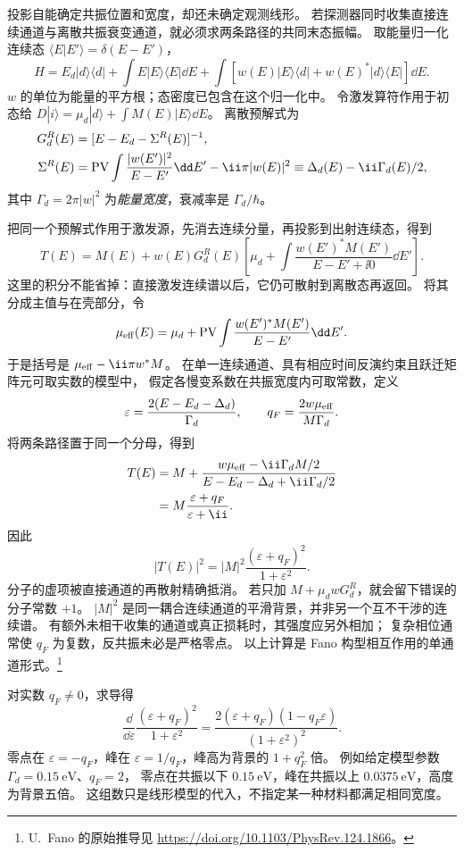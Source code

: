 \begin{exbox}
投影自能确定共振位置和宽度，却还未确定观测线形。
若探测器同时收集直接连续通道与离散共振衰变通道，就必须求两条路径的共同末态振幅。
取能量归一化连续态 $\langle E|E'\rangle=\delta(E-E')$，
\[
H=E_d|d\rangle\langle d|+\int E|E\rangle\langle E|\dd E
+\int[w(E)|E\rangle\langle d|+w(E)^*|d\rangle\langle E|]\dd E.
\]
$w$ 的单位为能量的平方根；态密度已包含在这个归一化中。
令激发算符作用于初态给
$D|i\rangle=\mu_d|d\rangle+\int M(E)|E\rangle\dd E$。
离散预解式为
\begin{align}
G_d^R(E)&=[E-E_d-\Sigma^R(E)]^{-1},
\label{eq:feqo-fano-selfenergy}\\
\Sigma^R(E)&=\mathop{\rm PV}\int\frac{|w(E')|^2}{E-E'}\dd E'
-\ii\pi|w(E)|^2\equiv\Delta_d(E)-\ii\Gamma_d(E)/2,
\label{eq:feqo-fano-width-shift}
\end{align}
其中 $\Gamma_d=2\pi|w|^2$ 为\emph{能量宽度}，衰减率是 $\Gamma_d/\hbar$。

把同一个预解式作用于激发源，先消去连续分量，再投影到出射连续态，得到
\[
T(E)=M(E)+w(E)G_d^R(E)
\left[\mu_d+\int\frac{w(E')^*M(E')}{E-E'+\ii0}\dd E'\right].
\]
这里的积分不能省掉：直接激发连续谱以后，它仍可散射到离散态再返回。
将其分成主值与在壳部分，令
\[
\mu_{\rm eff}(E)=\mu_d+\mathop{\rm PV}\int
\frac{w(E')^*M(E')}{E-E'}\dd E'.
\]
于是括号是 $\mu_{\rm eff}-\ii\pi w^*M$。
在单一连续通道、具有相应时间反演约束且跃迁矩阵元可取实数的模型中，
假定各慢变系数在共振宽度内可取常数，定义
\begin{equation}
\varepsilon=\frac{2(E-E_d-\Delta_d)}{\Gamma_d},
\qquad q_F=\frac{2w\mu_{\rm eff}}{M\Gamma_d}.
\label{eq:feqo-fano-q}
\end{equation}
将两条路径置于同一个分母，得到
\begin{align*}
T(E)&=M+\frac{w\mu_{\rm eff}-\ii\Gamma_dM/2}
{E-E_d-\Delta_d+\ii\Gamma_d/2}\\
&=M\frac{\varepsilon+q_F}{\varepsilon+\ii}.
\end{align*}
因此
\begin{equation}
|T(E)|^2=|M|^2\frac{(\varepsilon+q_F)^2}{1+\varepsilon^2}.
\label{eq:feqo-fano-lineshape}
\end{equation}
分子的虚项被直接通道的再散射精确抵消。
若只加 $M+\mu_dwG_d^R$，就会留下错误的分子常数 $+1$。
$|M|^2$ 是同一耦合连续通道的平滑背景，并非另一个互不干涉的连续谱。
有额外未相干收集的通道或真正损耗时，其强度应另外相加；
复杂相位通常使 $q_F$ 为复数，反共振未必是严格零点。
以上计算是 Fano 构型相互作用的单通道形式。\footnote{U.~Fano 的原始推导见
\url{https://doi.org/10.1103/PhysRev.124.1866}。}

对实数 $q_F\ne0$，求导得
\[
\frac{\dd}{\dd\varepsilon}\frac{(\varepsilon+q_F)^2}{1+\varepsilon^2}
=\frac{2(\varepsilon+q_F)(1-q_F\varepsilon)}{(1+\varepsilon^2)^2}.
\]
零点在 $\varepsilon=-q_F$，峰在 $\varepsilon=1/q_F$，峰高为背景的 $1+q_F^2$ 倍。
例如给定模型参数 $\Gamma_d=\SI{0.15}{\electronvolt}$、$q_F=2$，
零点在共振以下 $\SI{0.15}{\electronvolt}$，峰在共振以上
$\SI{0.0375}{\electronvolt}$，高度为背景五倍。
这组数只是线形模型的代入，不指定某一种材料都满足相同宽度。
\end{exbox}
